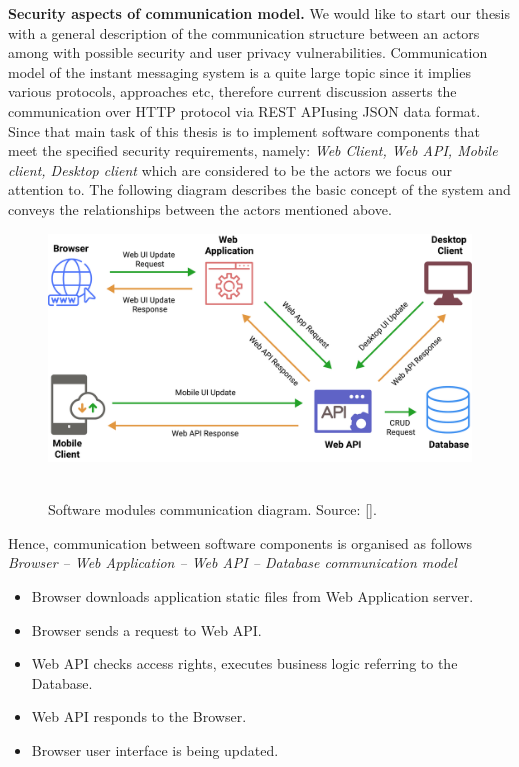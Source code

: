 \textbf{Security aspects of communication model.} We would like to start our thesis with a general description of the
communication structure between an actors among with possible security and user privacy vulnerabilities.
Communication model of the instant messaging system is a quite large topic since it implies various protocols, approaches etc,
therefore current discussion asserts the communication over HTTP protocol via REST API\@ using JSON data format.
Since that main task of this thesis is to implement software components that meet the specified security requirements,
namely: \textit{Web Client, Web API, Mobile client, Desktop client} which are
considered to be the actors we focus our attention to.
The following diagram describes the basic concept of the system and conveys the relationships between the
actors mentioned above.

\begin{figure}[H]
    \centering
    \includegraphics[width=1\textwidth]{Pictures/01_Software_modules_communication_diagram}
    ~\caption{Software modules communication diagram. Source: [\cite{mango2021figma}].}\label{fig:figure6}
\end{figure}

Hence, communication between software components is organised as follows\\

\textit{Browser -- Web Application -- Web API -- Database communication model}
\begin{itemize}
    \item Browser downloads application static files from Web Application server.
    \item Browser sends a request to Web API\@.
    \item Web API checks access rights, executes business logic referring to the Database.
    \item Web API responds to the Browser.
    \item Browser user interface is being updated.
\end{itemize}

